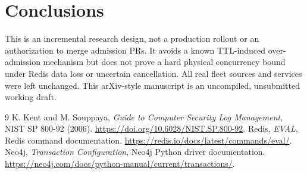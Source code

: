 \documentclass[11pt]{article}
\begin{document}
\section{Conclusions}
This is an incremental research design, not a production rollout or an authorization to merge admission PRs. It avoids a known TTL-induced over-admission mechanism but does not prove a hard physical concurrency bound under Redis data loss or uncertain cancellation. All real fleet sources and services were left unchanged. This arXiv-style manuscript is an uncompiled, unsubmitted working draft.
\begin{thebibliography}{9}
 K. Kent and M. Souppaya, \emph{Guide to Computer Security Log Management}, NIST SP 800-92 (2006). \url{https://doi.org/10.6028/NIST.SP.800-92}.
 Redis, \emph{EVAL}, Redis command documentation. \url{https://redis.io/docs/latest/commands/eval/}.
 Neo4j, \emph{Transaction Configuration}, Neo4j Python driver documentation. \url{https://neo4j.com/docs/python-manual/current/transactions/}.
\end{thebibliography}
\end{document}
